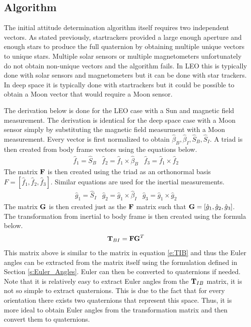 \documentclass{article}
\begin{document}
\subsection{Algorithm}

The initial attitude determination algorithm itself requires two
independent vectors. As stated previously, startrackers provided a
large enough aperture and enough stars to produce the full
quaternion by obtaining multiple unique vectors to unique
stars. Multiple solar sensors or multiple magnetometers unfortunately
do not obtain non-unique vectors and the algorithm fails. In LEO this
is typically done with solar sensors and magnetometers but it can be
done with star trackers. In deep space it is typically done with
startrackers but it could be possible to obtain a Moon vector that
would require a Moon sensor.

The derivation below is done for the LEO case with a Sun and magnetic
field measurement. The derivation is identical for the deep space case
with a Moon sensor simply by substituting the magnetic field
measurment with a Moon measurement. Every vector is first normalized to obtain
$\hat{\beta}_B,\hat{\beta}_I,\hat{S}_B,\hat{S}_I$. A triad is then created
from body frame vectors using the equations below.
\begin{equation}
  \begin{matrix} \hat{f}_1 = \hat{S}_B & \hat{f}_2 = \hat{f}_1 \times
    \hat{\beta}_B & \hat{f}_3 = \hat{f}_1 \times \hat{f}_2 \end{matrix}
\end{equation}
The matrix ${\bf F}$ is then created using the triad as an orthonormal basis
$F = [\hat{f}_1,\hat{f}_2,\hat{f}_3]$. Similar equations are used for
the inertial measurements. 
\begin{equation}
  \begin{matrix} \hat{g}_1 = \hat{S}_I & \hat{g}_2 = \hat{g}_1 \times
    \hat{\beta}_I & \hat{g}_3 = \hat{g}_1 \times \hat{g}_2 \end{matrix}
\end{equation}
The matrix ${\bf G}$ is then created just as the ${\bf F}$ matrix such
that ${\bf G} =
[\hat{g}_1,\hat{g}_2,\hat{g}_3]$. The transformation from inertial to
body frame is then created using the formula below.
\begin{equation}
  {\bf T}_{BI} = {\bf FG}^T
\end{equation}
This matrix above is similar to the matrix in equation \ref{e:TIB} and
thus the Euler angles can be extracted from the matrix itself using
the formulation defined in Section \ref{s:Euler_Angles}. Euler can
then be converted to quaternions if needed. Note that it is relatively
easy to extract Euler angles from the ${\bf T}_{IB}$ matrix, it is not so
simple to extract quaternions. This is due to the fact that for every
orientation there exists two quaternions that represent this
space. Thus, it is more ideal to obtain Euler angles from the
transformation matrix and then convert them to quaternions.
\end{document}
